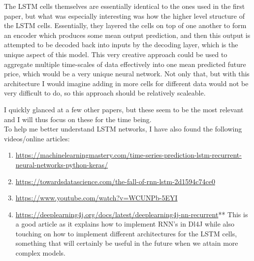 \documentclass{article}
\begin{document}
\begin{enumerate}
The LSTM cells themselves are essentially identical to the ones used in the first paper, but what was especially interesting was how the higher level structure of the LSTM cells. Essentially, they layered the cells on top of one another to form an encoder which produces some mean output prediction, and then this output is attempted to be decoded back into inputs by the decoding layer, which is the unique aspect of this model. This very creative approach could be used to aggregate multiple time-scales of data effectively into one mean predicted future price, which would be a very unique neural network. Not only that, but with this architecture I would imagine adding in more cells for different data would not be very difficult to do, so this approach should be relatively scaleable. 
\end{enumerate}
I quickly glanced at a few other papers, but these seem to be the most relevant and I will thus focus on these for the time being. \\\newline 
To help me better understand LSTM networks, I have also found the following videos/online articles: \\
\begin{enumerate}
\item \href{https://machinelearningmastery.com/time-series-prediction-lstm-recurrent-neural-networks-python-keras/}{https://machinelearningmastery.com/time-series-prediction-lstm-recurrent-neural-networks-python-keras/}
\item \href{https://towardsdatascience.com/the-fall-of-rnn-lstm-2d1594c74ce0}{https://towardsdatascience.com/the-fall-of-rnn-lstm-2d1594c74ce0}
\item \href{https://www.youtube.com/watch?v=WCUNPb-5EYI}{https://www.youtube.com/watch?v=WCUNPb-5EYI}
\item \href{https://deeplearning4j.org/docs/latest/deeplearning4j-nn-recurrent}{https://deeplearning4j.org/docs/latest/deeplearning4j-nn-recurrent}** This is a good article as it explains how to implement RNN's in Dl4J while also touching on how to implement different architectures for the LSTM cells, something that will certainly be useful in the future when we attain more complex models.
\end{enumerate}
\end{document}
